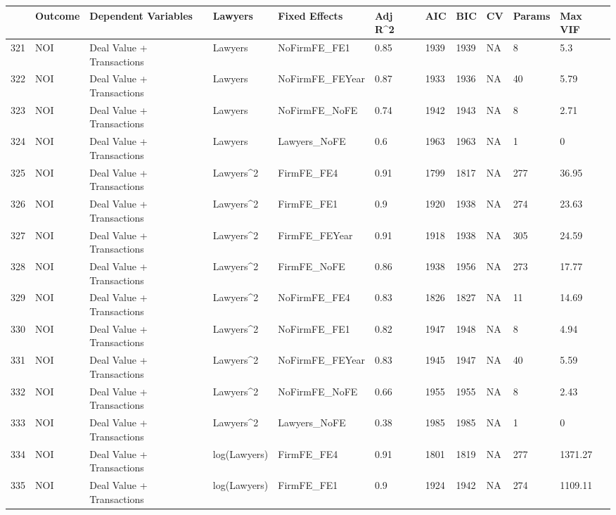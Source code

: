 \begin{table}[ht]
\centering
\begin{tabular}{rllllllllll}
  \hline
 & Outcome & Dependent Variables & Lawyers & Fixed Effects & Adj R^2 & AIC & BIC & CV & Params & Max VIF \\ 
  \hline
321 & NOI & Deal Value + Transactions & Lawyers & NoFirmFE\_FE1 & 0.85 & 1939 & 1939 & NA & 8 & 5.3 \\ 
  322 & NOI & Deal Value + Transactions & Lawyers & NoFirmFE\_FEYear & 0.87 & 1933 & 1936 & NA & 40 & 5.79 \\ 
  323 & NOI & Deal Value + Transactions & Lawyers & NoFirmFE\_NoFE & 0.74 & 1942 & 1943 & NA & 8 & 2.71 \\ 
  324 & NOI & Deal Value + Transactions & Lawyers & Lawyers\_NoFE & 0.6 & 1963 & 1963 & NA & 1 & 0 \\ 
  325 & NOI & Deal Value + Transactions & Lawyers^2 & FirmFE\_FE4 & 0.91 & 1799 & 1817 & NA & 277 & 36.95 \\ 
  326 & NOI & Deal Value + Transactions & Lawyers^2 & FirmFE\_FE1 & 0.9 & 1920 & 1938 & NA & 274 & 23.63 \\ 
  327 & NOI & Deal Value + Transactions & Lawyers^2 & FirmFE\_FEYear & 0.91 & 1918 & 1938 & NA & 305 & 24.59 \\ 
  328 & NOI & Deal Value + Transactions & Lawyers^2 & FirmFE\_NoFE & 0.86 & 1938 & 1956 & NA & 273 & 17.77 \\ 
  329 & NOI & Deal Value + Transactions & Lawyers^2 & NoFirmFE\_FE4 & 0.83 & 1826 & 1827 & NA & 11 & 14.69 \\ 
  330 & NOI & Deal Value + Transactions & Lawyers^2 & NoFirmFE\_FE1 & 0.82 & 1947 & 1948 & NA & 8 & 4.94 \\ 
  331 & NOI & Deal Value + Transactions & Lawyers^2 & NoFirmFE\_FEYear & 0.83 & 1945 & 1947 & NA & 40 & 5.59 \\ 
  332 & NOI & Deal Value + Transactions & Lawyers^2 & NoFirmFE\_NoFE & 0.66 & 1955 & 1955 & NA & 8 & 2.43 \\ 
  333 & NOI & Deal Value + Transactions & Lawyers^2 & Lawyers\_NoFE & 0.38 & 1985 & 1985 & NA & 1 & 0 \\ 
  334 & NOI & Deal Value + Transactions & log(Lawyers) & FirmFE\_FE4 & 0.91 & 1801 & 1819 & NA & 277 & 1371.27 \\ 
  335 & NOI & Deal Value + Transactions & log(Lawyers) & FirmFE\_FE1 & 0.9 & 1924 & 1942 & NA & 274 & 1109.11 \\ 

\end{tabular}
\end{table}
